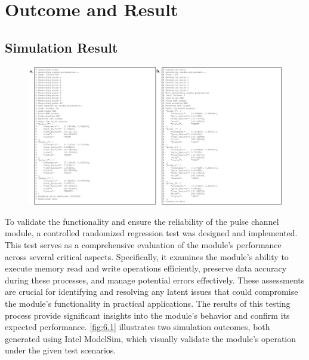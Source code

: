 \chapter{Outcome and Result}

\section{Simulation Result}
\begin{figure}[h]
    \centering
    \includegraphics[width=1\linewidth]{figures/6.1.png}
    \caption{}
    \label{fig:6.1}
\end{figure}
To validate the functionality and ensure the reliability of the pulse channel module, a controlled randomized regression test was designed and implemented. This test serves as a comprehensive evaluation of the module’s performance across several critical aspects. Specifically, it examines the module's ability to execute memory read and write operations efficiently, preserve data accuracy during these processes, and manage potential errors effectively. These assessments are crucial for identifying and resolving any latent issues that could compromise the module's functionality in practical applications. The results of this testing process provide significant insights into the module's behavior and confirm its expected performance. \autoref{fig:6.1} illustrates two simulation outcomes, both generated using Intel ModelSim, which visually validate the module’s operation under the given test scenarios.



